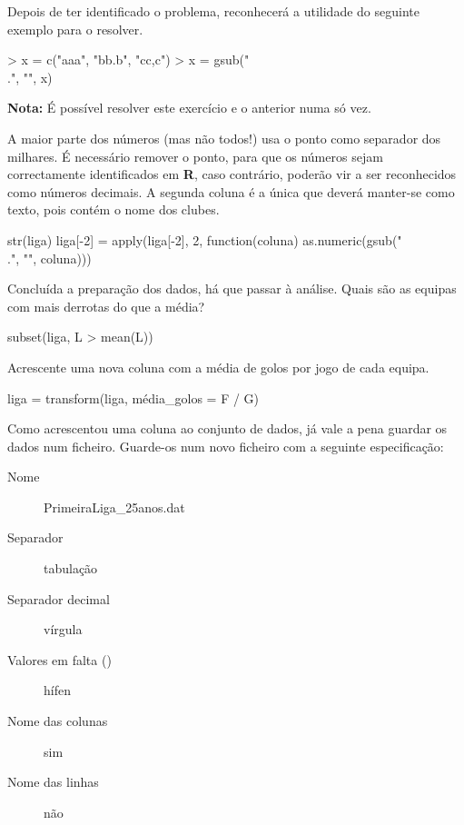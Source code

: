 \documentclass{exam}
\begin{document}
\begin{questions}
Depois de ter identificado o problema, reconhecerá a utilidade do seguinte exemplo para o resolver.

\begin{rcode}
	> x = c("aaa", "bb.b", "cc,c")
	> x = gsub("\\.", "", x)
\end{rcode}

\textbf{Nota:} É possível resolver este exercício e o anterior numa só vez.

\begin{solution}
	A maior parte dos números (mas não todos!) usa o ponto como separador dos milhares. É necessário remover o ponto, para que os números sejam correctamente identificados em \textbf{R}, caso contrário, poderão vir a ser reconhecidos como números decimais. A segunda coluna é a única que deverá manter-se como texto, pois contém o nome dos clubes.
	\begin{rcode}
		str(liga)
		liga[-2] = apply(liga[-2], 2, function(coluna) as.numeric(gsub("\\.", "", coluna)))
	\end{rcode}
\end{solution}

\question Concluída a preparação dos dados, há que passar à análise. Quais são as equipas com mais derrotas do que a média?

\begin{solution}
	\begin{rcode}
		subset(liga, L > mean(L))
	\end{rcode}
\end{solution}

\question Acrescente uma nova coluna com a média de golos por jogo de cada equipa.

\begin{solution}
	\begin{rcode}
		liga = transform(liga, média_golos = F / G)
	\end{rcode}
\end{solution}

\question Como acrescentou uma coluna ao conjunto de dados, já vale a pena guardar os dados num ficheiro. Guarde-os num novo ficheiro com a seguinte especificação:

\begin{description}
	\item[Nome] PrimeiraLiga\_25anos.dat
	\item[Separador] tabulação
	\item[Separador decimal] vírgula
	\item[Valores em falta ()] hífen
	\item[Nome das colunas] sim
	\item[Nome das linhas] não
\end{description}


\end{questions}
\end{document}
